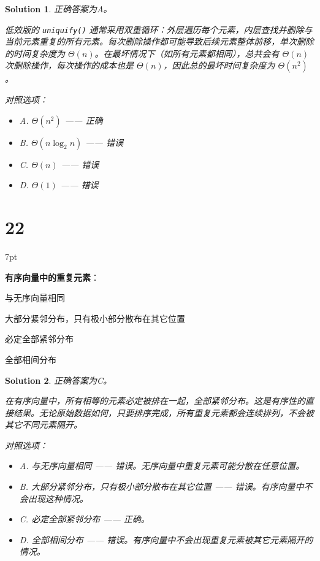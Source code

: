 \documentclass[UTF8]{report}
\newtheorem{solution}{Solution}
\theoremstyle{MyLineTheoremStyle} %
\theoremstyle{MyBlockTheoremStyle} %
\theoremstyle{MySubsubsectionStyle} %
\newenvironment{graybox}{%
        \def\FrameCommand{%
        \hspace{1pt}%
        {\color{gray}\small \vrule width 2pt}%
        {\color{graybox_color}\vrule width 4pt}%
        \colorbox{graybox_color}%
        }%
        \MakeFramed{\advance\hsize-\width\FrameRestore}%
        \noindent\hspace{-4.55pt}%
        \begin{adjustwidth}{}{7pt}%
        \vspace{2pt}\vspace{2pt}%
        }
        {%
        \vspace{2pt}\end{adjustwidth}\endMakeFramed%
        }
\begin{document}
\begin{solution}
正确答案为A。

低效版的 \texttt{uniquify()} 通常采用双重循环：外层遍历每个元素，内层查找并删除与当前元素重复的所有元素。每次删除操作都可能导致后续元素整体前移，单次删除的时间复杂度为 $\Theta(n)$。在最坏情况下（如所有元素都相同），总共会有 $\Theta(n)$ 次删除操作，每次操作的成本也是 $\Theta(n)$，因此总的最坏时间复杂度为 $\Theta(n^2)$。

对照选项：
\begin{itemize}
    \item A. $\Theta(n^2)$ —— 正确
    \item B. $\Theta(n\log_{2}n)$ —— 错误
    \item C. $\Theta(n)$ —— 错误
    \item D. $\Theta(1)$ —— 错误
\end{itemize}
\end{solution}


\section*{22}

\begin{graybox}
\textbf{有序向量中的重复元素}：
\begin{circledenum}
    \item 与无序向量相同
    \item 大部分紧邻分布，只有极小部分散布在其它位置
    \item 必定全部紧邻分布
    \item 全部相间分布
\end{circledenum}
\end{graybox}

\begin{solution}
正确答案为C。

在有序向量中，所有相等的元素必定被排在一起，全部紧邻分布。这是有序性的直接结果。无论原始数据如何，只要排序完成，所有重复元素都会连续排列，不会被其它不同元素隔开。

对照选项：
\begin{itemize}
    \item A. 与无序向量相同 —— 错误。无序向量中重复元素可能分散在任意位置。
    \item B. 大部分紧邻分布，只有极小部分散布在其它位置 —— 错误。有序向量中不会出现这种情况。
    \item C. 必定全部紧邻分布 —— 正确。
    \item D. 全部相间分布 —— 错误。有序向量中不会出现重复元素被其它元素隔开的情况。
\end{itemize}
\end{solution}
\end{document}
